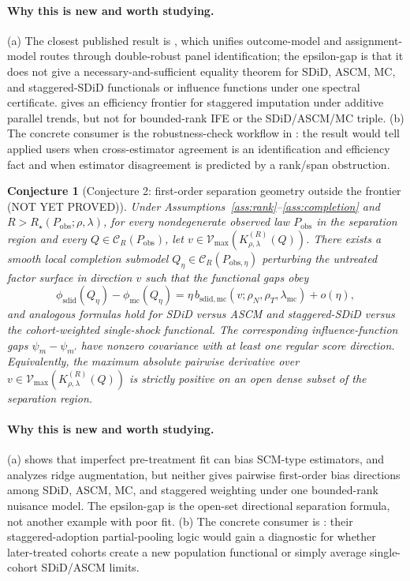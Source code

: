 \documentclass[11pt]{article}
\theoremstyle{definition}
\theoremstyle{plain}
\newtheorem{conjecture}{Conjecture}
\theoremstyle{remark}
\begin{document}
\paragraph{Why this is new and worth studying.}
(a) The closest published result is \citet{ArkhangelskyImbens2022}, which unifies outcome-model and assignment-model routes through double-robust panel identification; the epsilon-gap is that it does not give a necessary-and-sufficient equality theorem for SDiD, ASCM, MC, and staggered-SDiD functionals or influence functions under one spectral certificate.  \citet{BorusyakJaravelSpiess2024} gives an efficiency frontier for staggered imputation under additive parallel trends, but not for bounded-rank IFE or the SDiD/ASCM/MC triple.  (b) The concrete consumer is the robustness-check workflow in \citet{Abadie2021}: the result would tell applied users when cross-estimator agreement is an identification and efficiency fact and when estimator disagreement is predicted by a rank/span obstruction.

\begin{conjecture}[Conjecture 2: first-order separation geometry outside the frontier (NOT YET PROVED)]\label{conj:bias-geometry}
Under Assumptions~\ref{ass:rank}--\ref{ass:completion} and \(R>R_\star(P_{\mathrm{obs}};\rho,\lambda)\), for every nondegenerate observed law \(P_{\mathrm{obs}}\) in the separation region and every \(Q\in\mathcal C_R(P_{\mathrm{obs}})\), let \(v\in\mathcal V_{\max}(K^{(R)}_{\rho,\lambda}(Q))\).  There exists a smooth local completion submodel \(Q_\eta\in\mathcal C_R(P_{\mathrm{obs},\eta})\) perturbing the untreated factor surface in direction \(v\) such that the functional gaps obey
\[
\phi_{\mathrm{sdid}}(Q_\eta)-\phi_{\mathrm{mc}}(Q_\eta)
=\eta\, b_{\mathrm{sdid},\mathrm{mc}}(v;\rho_N,\rho_T,\lambda_{\mathrm{mc}})+o(\eta),
\]
and analogous formulas hold for SDiD versus ASCM and staggered-SDiD versus the cohort-weighted single-shock functional.  The corresponding influence-function gaps \(\psi_m-\psi_{m'}\) have nonzero covariance with at least one regular score direction.  Equivalently, the maximum absolute pairwise derivative over \(v\in\mathcal V_{\max}(K^{(R)}_{\rho,\lambda}(Q))\) is strictly positive on an open dense subset of the separation region.
\end{conjecture}
\paragraph{Why this is new and worth studying.}
(a) \citet{FermanPinto2021} shows that imperfect pre-treatment fit can bias SCM-type estimators, and \citet{BenMichaelFellerRothstein2021} analyzes ridge augmentation, but neither gives pairwise first-order bias directions among SDiD, ASCM, MC, and staggered weighting under one bounded-rank nuisance model.  The epsilon-gap is the open-set directional separation formula, not another example with poor fit.  (b) The concrete consumer is \citet{BenMichaelFellerRothstein2022}: their staggered-adoption partial-pooling logic would gain a diagnostic for whether later-treated cohorts create a new population functional or simply average single-cohort SDiD/ASCM limits.
\end{document}

